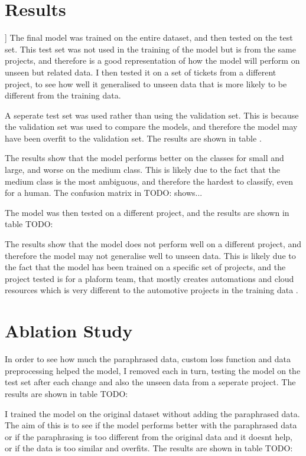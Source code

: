 \documentclass{UoYCSproject}
\begin{document}
    \section{Results}]
    The final model was trained on the entire dataset, and then tested on the test set.
    This test set was not used in the training of the model but is from the same projects, and therefore is a good representation of how the model will perform on unseen but related data.
    I then tested it on a set of tickets from a different project, to see how well it generalised to unseen data that is more likely to be different from the training data.

    A seperate test set was used rather than using the validation set. This is because the validation set was used to compare the models, and therefore the model may have been overfit to the validation set.
    The results are shown in table .

    The results show that the model performs better on the classes for small and large, and worse on the medium class.
    This is likely due to the fact that the medium class is the most ambiguous, and therefore the hardest to classify, even for a human.
    The confusion matrix in TODO:  shows...

The model was then tested on a different project, and the results are shown in table TODO: \par
The results show that the model does not perform well on a different project, and therefore the model may not generalise well to unseen data.
This is likely due to the fact that the model has been trained on a specific set of projects, and the project tested is for a plaform team, that mostly creates automations and cloud resources which is very different to the automotive projects in the training data .


    \section{Ablation Study}
    In order to see how much the paraphrased data, custom loss function and data preprocessing helped the model, I removed each in turn, testing the model on the test set after each change and also the unseen data from a seperate project.
    The results are shown in table TODO: \par
    I trained the model on the original dataset without adding the paraphrased data.
    The aim of this is to see if the model performs better with the paraphrased data or if the paraphrasing is too different from the original data and it doesnt help, or if the data is too similar and overfits.
    The results are shown in table TODO: \par
\end{document}
